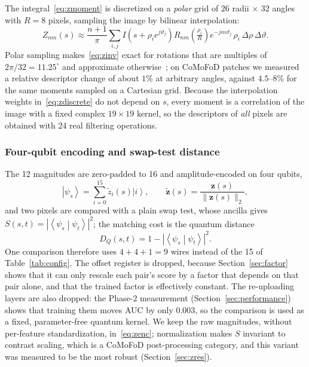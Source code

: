 \documentclass[conference]{IEEEtran}
\newcommand{\ket}[1]{\left|#1\right\rangle}
\newcommand{\braket}[2]{\left\langle#1\middle|#2\right\rangle}
\begin{document}
The integral~\eqref{eq:zmoment} is discretized on a \emph{polar} grid of $26$ radii $\times$ $32$ angles with $R = 8$ pixels, sampling the image by bilinear interpolation:
\begin{equation}
Z_{nm}(s) \approx \frac{n+1}{\pi}\sum_{i,j} I\!\left(s + \rho_i e^{j\vartheta_j}\right) R_{nm}\!\left(\tfrac{\rho_i}{R}\right) e^{-jm\vartheta_j}\,\rho_i\,\Delta\rho\,\Delta\vartheta .
\label{eq:zdiscrete}
\end{equation}
Polar sampling makes~\eqref{eq:zinv} exact for rotations that are multiples of $2\pi/32 = 11.25^\circ$ and approximate otherwise~\cite{xin2007}; on CoMoFoD patches we measured a relative descriptor change of about $1\%$ at arbitrary angles, against $4.5$--$8\%$ for the same moments sampled on a Cartesian grid. Because the interpolation weights in~\eqref{eq:zdiscrete} do not depend on $s$, every moment is a correlation of the image with a fixed complex $19\times19$ kernel, so the descriptors of \emph{all} pixels are obtained with 24 real filtering operations.

\subsubsection{Four-qubit encoding and swap-test distance}
The 12 magnitudes are zero-padded to 16 and amplitude-encoded on four qubits,
\begin{equation}
\ket{\psi_s} = \sum_{i=0}^{15} \tilde{z}_i(s)\ket{i}, \qquad \tilde{\mathbf{z}}(s) = \frac{\mathbf{z}(s)}{\|\mathbf{z}(s)\|_2},
\label{eq:zenc}
\end{equation}
and two pixels are compared with a plain swap test, whose ancilla gives $S(s,t) = |\braket{\psi_s}{\psi_t}|^2$; the matching cost is the quantum distance
\begin{equation}
D_Q(s,t) = 1 - \left|\braket{\psi_s}{\psi_t}\right|^2 .
\label{eq:dq}
\end{equation}
One comparison therefore uses $4+4+1 = 9$ wires instead of the 15 of Table~\ref{tab:config}. The offset register is dropped, because Section~\ref{sec:factor} shows that it can only rescale each pair's score by a factor that depends on that pair alone, and that the trained factor is effectively constant. The re-uploading layers are also dropped: the Phase-2 measurement (Section~\ref{sec:performance}) shows that training them moves AUC by only $0.003$, so the comparison is used as a fixed, parameter-free quantum kernel. We keep the raw magnitudes, without per-feature standardization, in~\eqref{eq:zenc}; normalization makes $S$ invariant to contrast scaling, which is a CoMoFoD post-processing category, and this variant was measured to be the most robust (Section~\ref{sec:zres}).
\end{document}
